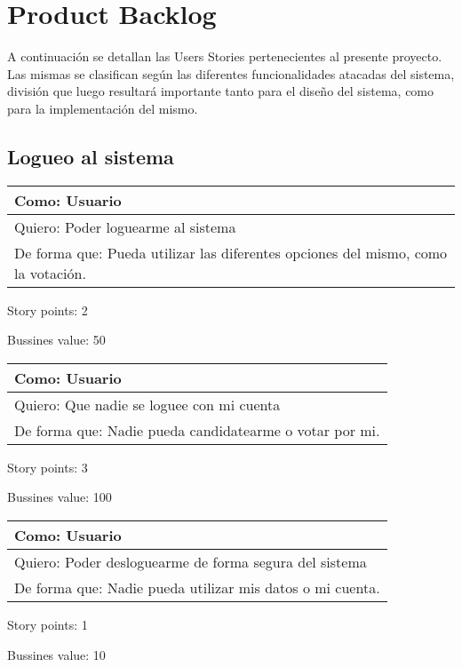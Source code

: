 \section{Product Backlog}


A continuaci\'on se detallan las Users Stories pertenecientes al presente proyecto.
Las mismas se clasifican seg\'un las diferentes funcionalidades atacadas del sistema, divisi\'on que luego resultar\'a importante tanto para el dise\~{n}o del sistema, como para la implementaci\'on del mismo.

\subsection*{Logueo al sistema}


\bigskip

\begin{tabular}{|l|}
\hline
Como: Usuario\\
\hline
Quiero: Poder loguearme al sistema\\
\hline
De forma que: Pueda utilizar las diferentes opciones del mismo, como la votaci\'on. \\
\hline
\end{tabular}

\medskip
Story points: 2

\medskip
Bussines value: 50

\bigskip

\begin{tabular}{|l|}
\hline
Como: Usuario\\
\hline
Quiero: Que nadie se loguee con mi cuenta\\
\hline
De forma que: Nadie pueda candidatearme o votar por mi. \\
\hline
\end{tabular}

\medskip
Story points: 3

\medskip
Bussines value: 100


\bigskip

\begin{tabular}{|l|}
\hline
Como: Usuario\\
\hline
Quiero: Poder desloguearme de forma segura del sistema\\
\hline
De forma que: Nadie pueda utilizar mis datos o mi cuenta.\\
\hline
\end{tabular}

\medskip
Story points: 1

\medskip
Bussines value: 10


